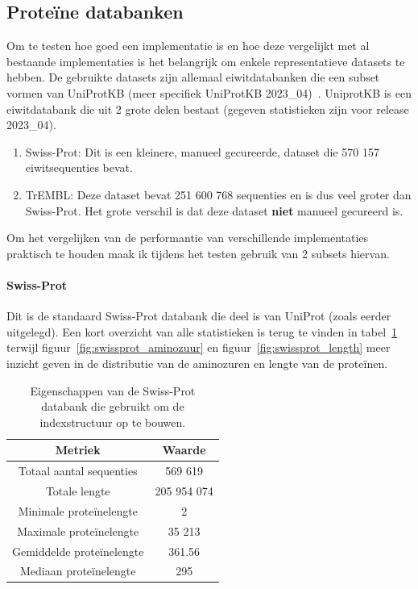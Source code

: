\documentclass[11pt,dutch,faculty=we,layout=titlefont,underline=false,titleUppercase=true,titleUnderline=true]{ugent2016-report}
\begin{document}
    \subsection{Proteïne databanken}\label{subsec:proteine-databanken}
    Om te testen hoe goed een implementatie is en hoe deze vergelijkt met al bestaande implementaties is het belangrijk om enkele representatieve datasets te hebben.
    De gebruikte datasets zijn allemaal eiwitdatabanken die een subset vormen van UniProtKB (meer specifiek UniProtKB 2023\_04)~\cite{UniprotKB}.
    UniprotKB is een eiwitdatabank die uit 2 grote delen bestaat (gegeven statistieken zijn voor release 2023\_04).
    \begin{enumerate}
        \item Swiss-Prot: Dit is een kleinere, manueel gecureerde, dataset die 570 157 eiwitsequenties bevat.
        \item TrEMBL: Deze dataset bevat 251 600 768 sequenties en is dus veel groter dan Swiss-Prot.
        Het grote verschil is dat deze dataset \textbf{niet} manueel gecureerd is.
    \end{enumerate}
    Om het vergelijken van de performantie van verschillende implementaties praktisch te houden maak ik tijdens het testen gebruik van 2 subsets hiervan.

    \paragraph{Swiss-Prot} Dit is de standaard Swiss-Prot databank die deel is van UniProt (zoals eerder uitgelegd).
    Een kort overzicht van alle statistieken is terug te vinden in tabel~\ref{tab:swissprot_eigenschappen} terwijl figuur~\ref{fig:swissprot_aminozuur} en figuur~\ref{fig:swissprot_length} meer inzicht geven in de distributie van de aminozuren en lengte van de proteïnen.

    \begin{table}[h!]
        \centering
        \begin{tabular}{c c}
            Metriek                   & Waarde      \\
            \hline\hline
            Totaal aantal sequenties  & 569 619     \\
            Totale lengte             & 205 954 074 \\
            Minimale proteïnelengte   & 2           \\
            Maximale proteïnelengte   & 35 213      \\
            Gemiddelde proteïnelengte & 361.56      \\
            Mediaan proteïnelengte    & 295         \\
            \hline
        \end{tabular}
        \caption{Eigenschappen van de Swiss-Prot databank die gebruikt om de indexstructuur op te bouwen.}
        \label{tab:swissprot_eigenschappen}
    \end{table}
\end{document}
